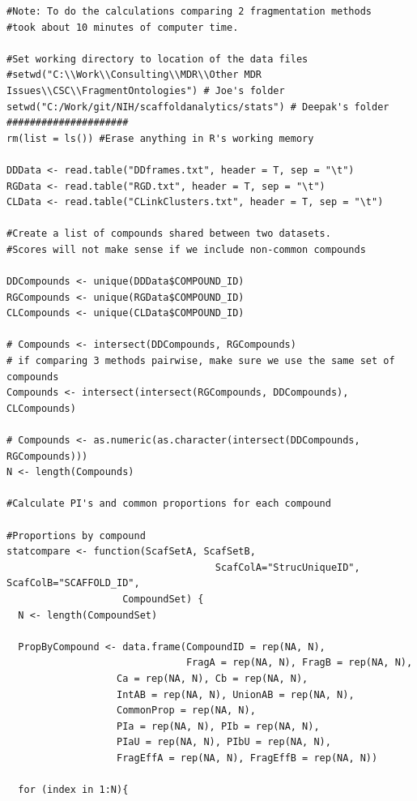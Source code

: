 \documentclass[11pt,letterpaper]{article}
\begin{document}
{\tiny
\begin{lstlisting}
#Note: To do the calculations comparing 2 fragmentation methods
#took about 10 minutes of computer time.

#Set working directory to location of the data files
#setwd("C:\\Work\\Consulting\\MDR\\Other MDR Issues\\CSC\\FragmentOntologies") # Joe's folder
setwd("C:/Work/git/NIH/scaffoldanalytics/stats") # Deepak's folder
#####################
rm(list = ls()) #Erase anything in R's working memory

DDData <- read.table("DDframes.txt", header = T, sep = "\t")
RGData <- read.table("RGD.txt", header = T, sep = "\t")
CLData <- read.table("CLinkClusters.txt", header = T, sep = "\t") 

#Create a list of compounds shared between two datasets.
#Scores will not make sense if we include non-common compounds

DDCompounds <- unique(DDData$COMPOUND_ID)
RGCompounds <- unique(RGData$COMPOUND_ID)
CLCompounds <- unique(CLData$COMPOUND_ID)  

# Compounds <- intersect(DDCompounds, RGCompounds)
# if comparing 3 methods pairwise, make sure we use the same set of compounds 
Compounds <- intersect(intersect(RGCompounds, DDCompounds), CLCompounds)

# Compounds <- as.numeric(as.character(intersect(DDCompounds, RGCompounds)))
N <- length(Compounds)

#Calculate PI's and common proportions for each compound
  
#Proportions by compound
statcompare <- function(ScafSetA, ScafSetB,
                        	        ScafColA="StrucUniqueID", ScafColB="SCAFFOLD_ID", 
			        CompoundSet) {
  N <- length(CompoundSet)
  
  PropByCompound <- data.frame(CompoundID = rep(NA, N),
                               FragA = rep(NA, N), FragB = rep(NA, N),
  			       Ca = rep(NA, N), Cb = rep(NA, N),
  			       IntAB = rep(NA, N), UnionAB = rep(NA, N),
  			       CommonProp = rep(NA, N),
  			       PIa = rep(NA, N), PIb = rep(NA, N),
  			       PIaU = rep(NA, N), PIbU = rep(NA, N),
  			       FragEffA = rep(NA, N), FragEffB = rep(NA, N))

  for (index in 1:N){
  

\end{lstlisting}}
\end{document}
